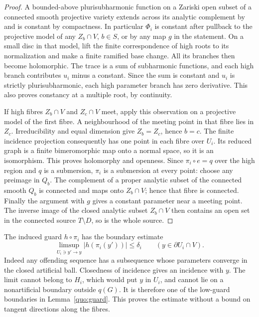 \begin{proof}
A bounded-above plurisubharmonic function on a Zariski open subset
of a connected smooth projective variety extends across its
analytic complement by \cite[I.5.24]{Demailly2012} and is constant
by compactness. In particular
\(\Phi_i\) is constant after pullback to the projective model
of any \(Z_b\cap V\), \(b\in S\), or by any map \(g\) in the
statement. On a small disc in that model, lift the finite
correspondence of high roots to its normalization and make a
finite ramified base change. All its branches then become
holomorphic. The trace is a sum of subharmonic functions, and
each high branch contributes \(u_i\) minus a constant. Since
the sum is constant and \(u_i\) is strictly plurisubharmonic,
each high parameter branch has zero derivative. This also proves
constancy at a multiple root, by continuity.

If high fibres \(Z_b\cap V\) and \(Z_c\cap V\) meet, apply this
observation on a projective model of the first fibre. A neighbourhood
of the meeting point in that fibre lies in \(Z_c\). Irreducibility
and equal dimension give \(Z_b=Z_c\), hence \(b=c\). The finite
incidence projection consequently has one point in each fibre
over \(U_i\). Its reduced graph is a finite bimeromorphic map
onto a normal space, so it is an isomorphism. This proves
holomorphy and openness. Since \(\pi_i\circ e=q\) over the high
region and \(q\) is a submersion, \(\pi_i\) is a submersion at
every point: choose any preimage in \(Q_b\). The complement of
a proper analytic subset of the connected smooth \(Q_b\) is
connected and maps onto \(Z_b\cap V\); hence that fibre is
connected. Finally the argument with \(g\) gives a constant
parameter near a meeting point. The inverse image of the closed
analytic subset \(Z_b\cap V\) then contains an open set in the
connected source \(T\setminus D\), so is the whole source.
\end{proof}

The induced guard \(h\circ\pi_i\) has the boundary estimate
\begin{equation}\label{quo:chart-boundary}
 \limsup_{U_i\ni y'\to y}|h(\pi_i(y'))|\leq\delta_i
 \qquad(y\in\partial U_i\cap V).
\end{equation}
Indeed any offending sequence has a subsequence whose parameters
converge in the closed artificial ball. Closedness of incidence
gives an incidence with \(y\). The limit cannot belong to \(H_i\),
which would put \(y\) in \(U_i\), and cannot lie on a
nonartificial boundary outside \(q(G)\). It is therefore one of
the low-guard boundaries in Lemma~\ref{quo:guard}. This proves
the estimate without a bound on tangent directions along the
fibres.

